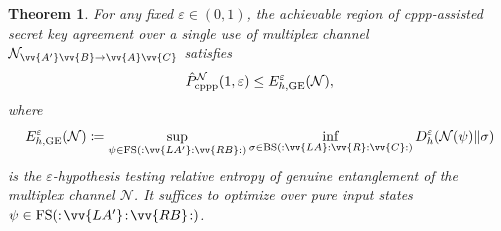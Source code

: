 \documentclass[aps,pra,twocolumn,superscriptaddress,longbibliography]{revtex4-1}
\def\FS{\operatorname{FS}}
\def\GE{\operatorname{GE}}
\def\BS{\operatorname{BS}}
\newcommand{\mc}[1]{\mathcal{#1}}
\newtheorem{theorem}{Theorem}
\begin{document}
\begin{theorem}\label{thm:one-shot-cppp}
For any fixed $\varepsilon\in(0,1)$, the achievable region of cppp-assisted secret key agreement over a single use of multiplex channel $\mc{N}_{\vv{A'}\vv{B}\to\vv{A}\vv{C}}$ satisfies 
\begin{equation}\label{eq:one-shot-cppp}
\hat{P}_{\textnormal{cppp}}^{\mc{N}}(1,\varepsilon)\leq E^\varepsilon_{h,\GE}(\mc{N}),
\end{equation} 
where 
\begin{equation}
E^{\varepsilon}_{h,\GE}(\mc{N})  \coloneqq \sup_{\psi\in\FS(:\vv{LA'}:\vv{RB}:)}\inf_{\sigma\in\BS(:\vv{LA}:\vv{R}:\vv{C}:)} D^\varepsilon_h(\mc{N}(\psi)\Vert\sigma)
\end{equation}
is the $\varepsilon$-hypothesis testing relative entropy of genuine entanglement of the multiplex channel $\mc{N}$. It suffices to optimize over pure input states $\psi\in\FS(:\!\vv{LA'}\!:\!\vv{RB}\!:)$.  
\end{theorem}
\iffalse
\end{document}

